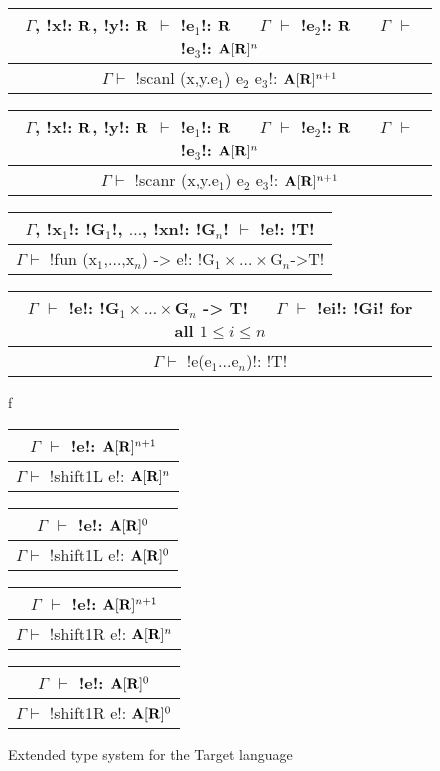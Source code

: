 \begin{figure*}[tb]
    \centering

    \begin{tabular}{c}
        $\Gamma$, !x!: $\mathbf{R}$, !y!: $\mathbf{R}$ $\vdash$ !e$_1$!: $\mathbf{R}$ 
        $\quad$ $\Gamma$ $\vdash$ !e$_2$!: $\mathbf{R}$
        $\quad$ $\Gamma$ $\vdash$ !e$_3$!: $\mathbf{A}[\mathbf{R}]^{n}$
        \\\hline  
        $\Gamma \vdash$ !scanl (x,y.e$_1$) e$_2$ e$_3$!: $\mathbf{A}[\mathbf{R}]^{n+1}$
    \end{tabular}

    \begin{tabular}{c}
        $\Gamma$, !x!: $\mathbf{R}$, !y!: $\mathbf{R}$ $\vdash$ !e$_1$!: $\mathbf{R}$ 
        $\quad$ $\Gamma$ $\vdash$ !e$_2$!: $\mathbf{R}$
        $\quad$ $\Gamma$ $\vdash$ !e$_3$!: $\mathbf{A}[\mathbf{R}]^{n}$
        \\\hline  
        $\Gamma \vdash$ !scanr (x,y.e$_1$) e$_2$ e$_3$!: $\mathbf{A}[\mathbf{R}]^{n+1}$
    \end{tabular}

    \begin{tabular}{c}
        $\Gamma$, !x$_1$!: !G$_1$!, $\ldots$, !xn!: !G$_n$! $\vdash$ !e!: !T! 
        \\\hline  
        $\Gamma \vdash$ !fun (x$_1$,$\ldots$,x$_n$) -> e!: !G$_1\times\ldots\times$G$_n$->T!
    \end{tabular}

    \begin{tabular}{c}
        $\Gamma$ $\vdash$ !e!: !G$_1\times\ldots\times$G$_n$ -> T!
        $\quad$ $\Gamma$ $\vdash$ !ei!: !Gi! for all $1\leq i\leq n$
        \\\hline  
        $\Gamma \vdash$ !e(e$_1\ldots$e$_n$)!: !T!
    \end{tabular}f

    \begin{tabular}{c}
        $\Gamma$ $\vdash$ !e!: $\mathbf{A}[\mathbf{R}]^{n+1}$
        \\\hline  
        $\Gamma \vdash$ !shift1L e!: $\mathbf{A}[\mathbf{R}]^{n}$
    \end{tabular}
    \hspace{0.5cm}
    \begin{tabular}{c}
        $\Gamma$ $\vdash$ !e!: $\mathbf{A}[\mathbf{R}]^{0}$
        \\\hline  
        $\Gamma \vdash$ !shift1L e!: $\mathbf{A}[\mathbf{R}]^{0}$
    \end{tabular}

    \begin{tabular}{c}
        $\Gamma$ $\vdash$ !e!: $\mathbf{A}[\mathbf{R}]^{n+1}$
        \\\hline  
        $\Gamma \vdash$ !shift1R e!: $\mathbf{A}[\mathbf{R}]^{n}$
    \end{tabular}
    \hspace{0.5cm}
    \begin{tabular}{c}
        $\Gamma$ $\vdash$ !e!: $\mathbf{A}[\mathbf{R}]^{0}$
        \\\hline  
        $\Gamma \vdash$ !shift1R e!: $\mathbf{A}[\mathbf{R}]^{0}$
    \end{tabular}

    \vspace{-0.2cm}
    \caption{Extended type system for the Target language}
    \vspace{-0.4cm}
    \label{fig:target_typesystem}
    \end{figure*}
